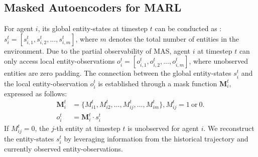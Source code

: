 \subsection{Masked Autoencoders for MARL}\label{subsec:MAE}
For agent $i$, its global entity-states at timestep $t$ can be conducted as : $s_i^t = [s_{i,1}^t,s_{i,2}^t,...,s_{i,m}^t]$, where $m$ denotes the total number of entities in the environment. Due to the partial observability of MAS, agent $i$ at timestep $t$ can only access local entity-observations $o_i^t = [o_{i,1}^t,o_{i,2}^t,...,o_{i,m}^t]$, where unobserved entities are zero padding. The connection between the global entity-states $s_i^t$ and the local entity-observation $o_i^t$ is established through a mask function $\bm{M}_i^t$, expressed as follows:
\begin{equation}
    \begin{split}
        {\bm{M}_i^t}&=\{M_{i1}^t,M_{i2}^t,\ldots,M_{ij}^t,\ldots,M_{im}^t\},M_{ij}^t=1 ~\mathrm{or}~ 0.\\
        o_{i}^t&={\bm{M}_i^t}\cdot s_i^t
    \end{split}
\end{equation}
If $M_{ij}^t=0$, the $j$-th entity at timestep $t$ is unobserved for agent $i$. We reconstruct the entity-states $s_i^t$ by leveraging information from the historical trajectory and currently observed entity-observations.

